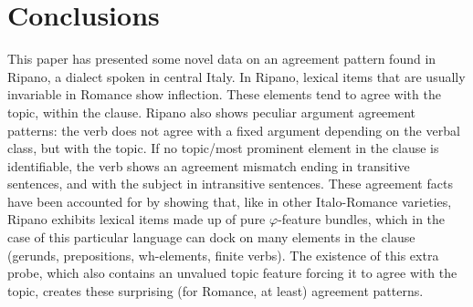 \documentclass[output=paper
,modfonts
,nonflat]{langsci/langscibook}
\begin{document}
\section{Conclusions} \label{sec-dalessandro:6}
This paper has presented some novel data on an agreement pattern found in Ripano, a dialect spoken in central Italy. In Ripano, lexical items that are usually invariable in Romance show inflection. These elements tend to agree with the topic, within the clause.
Ripano also shows peculiar argument agreement patterns: the verb does not agree with a fixed argument depending on the verbal class, but with the topic. If no topic/most prominent element in the clause is identifiable, the verb shows an agreement mismatch ending in transitive sentences, and with the subject in intransitive sentences.
These agreement facts have been accounted for by showing that, like in other Italo-Romance varieties, Ripano exhibits lexical items made up of pure $\varphi $-feature bundles, which in the case of this particular language can dock on many elements in the clause (gerunds, prepositions, wh-elements, finite verbs). The existence of this extra probe, which also contains an unvalued topic feature forcing it to agree with the topic, creates these surprising (for Romance, at least) agreement patterns.



{\sloppy
\printbibliography[heading=subbibliography,notkeyword=this]
}
\end{document}
